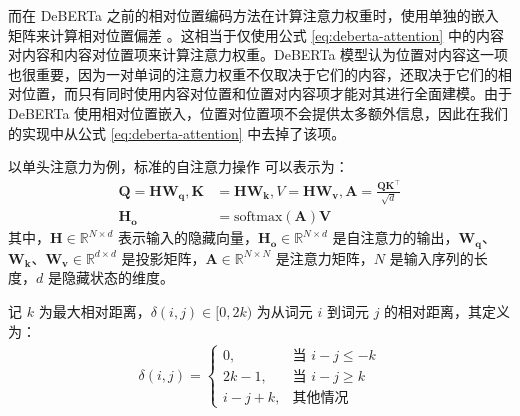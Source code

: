而在 DeBERTa 之前的相对位置编码方法在计算注意力权重时，使用单独的嵌入矩阵来计算相对位置偏差 \cite{Shaw2018SelfAttentionWR, Huang2018MusicTG}。这相当于仅使用公式 \ref{eq:deberta-attention} 中的内容对内容和内容对位置项来计算注意力权重。DeBERTa 模型认为位置对内容这一项也很重要，因为一对单词的注意力权重不仅取决于它们的内容，还取决于它们的相对位置，而只有同时使用内容对位置和位置对内容项才能对其进行全面建模。由于 DeBERTa 使用相对位置嵌入，位置对位置项不会提供太多额外信息，因此在我们的实现中从公式 \ref{eq:deberta-attention} 中去掉了该项。

以单头注意力为例，标准的自注意力操作 \cite{transformer} 可以表示为：
\begin{align}
\mathbf{Q} = \mathbf{HW_{q}}, \mathbf{K} &= \mathbf{HW_{k}}, V = \mathbf{HW_{v}}, \mathbf{A} = \frac{\mathbf{QK}^{\intercal}}{\sqrt{d}} \\
\mathbf{H_{o}} &= \text{softmax}(\mathbf{A})\mathbf{V}
\label{eq:transformer-attention1}
\end{align}
其中，$\mathbf{H} \in \mathbb{R}^{N×d}$ 表示输入的隐藏向量，$\mathbf{H_{o}} \in \mathbb{R}^{N×d}$ 是自注意力的输出，$\mathbf{W_{q}}$、$\mathbf{W_{k}}$、$\mathbf{W_{v}} \in \mathbb{R}^{d×d}$ 是投影矩阵，$\mathbf{A} \in \mathbb{R}^{N×N}$ 是注意力矩阵，$N$ 是输入序列的长度，$d$ 是隐藏状态的维度。

记 $k$ 为最大相对距离，$\delta(i, j) \in [0, 2k)$ 为从词元 $i$ 到词元 $j$ 的相对距离，其定义为：
\begin{align}
\delta(i, j)=\begin{cases}
0, & \text{当~} i - j \leq -k \\
2k - 1, & \text{当~} i - j \geq k \\
i - j + k, & \text{其他情况}
\end{cases}
\label{eq:deberta-distance}
\end{align}

